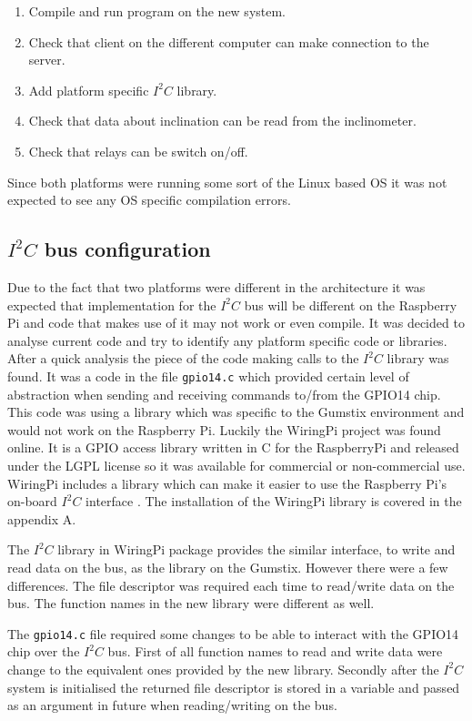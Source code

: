 \begin{enumerate}
\item Compile and run program on the new system.
\item Check that client on the different computer can make connection to the server.
\item Add platform specific $I^2C$ library.
\item Check that data about inclination can be read from the inclinometer.
\item Check that relays can be switch on/off.
\end{enumerate}

Since both platforms were running some sort of the Linux based OS it was not expected to see any OS specific compilation errors. 

\subsection{$I^2C$ bus configuration}
Due to the fact that two platforms were different in the architecture it was expected that implementation for the $I^2C$ bus will be different on the Raspberry Pi and code that makes use of it may not work or even compile. It was decided to analyse current code and try to identify any platform specific code or libraries. After a quick analysis the piece of the code making calls to the $I^2C$ library was found. It was a code in the file \texttt{gpio14.c} which provided certain level of abstraction when sending and receiving commands to/from the GPIO14 chip. This code was using a library which was specific to the Gumstix environment and would not work on the Raspberry Pi. Luckily the WiringPi project was found online. It is a GPIO access library written in C for the RaspberryPi and released under the LGPL license so it was available for commercial or non-commercial use. WiringPi includes a library which can make it easier to use the Raspberry Pi's on-board $I^2C$ interface \cite{WiringPi}. The installation of the WiringPi library is covered in the appendix A.

The $I^2C$ library in WiringPi package provides the similar interface, to write and read data on the bus, as the library on the Gumstix. However there were a few differences. The file descriptor was required each time to read/write data on the bus. The function names in the new library were different as well.

The \texttt{gpio14.c} file required some changes to be able to interact with the GPIO14 chip over the $I^2C$ bus. First of all function names to read and write data were change to the equivalent ones provided by the new library. Secondly after the $I^2C$ system is initialised the returned file descriptor is stored in a variable and passed as an argument in future when reading/writing on the bus.


